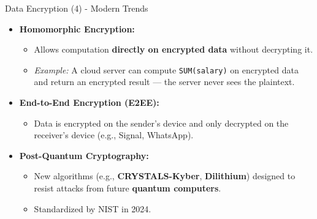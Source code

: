 \begin{frame}{Data Encryption (4) - Modern Trends}
    \Large
    
    \begin{itemize}
        
        \item \textbf{Homomorphic Encryption:}
        \begin{itemize}
            \large
            \item Allows computation \textbf{directly on encrypted data} without decrypting it.
            \item \textit{Example:} A cloud server can compute \texttt{SUM(salary)} on encrypted data and return an encrypted result --- the server never sees the plaintext.
        \end{itemize}
        
        \vspace{0.2cm}
        
        \item \textbf{End-to-End Encryption (E2EE):}
        \begin{itemize}
            \large
            \item Data is encrypted on the sender's device and only decrypted on the receiver's device (e.g., Signal, WhatsApp).
        \end{itemize}
        
        \vspace{0.2cm}
        
        \item \textbf{Post-Quantum Cryptography:}
        \begin{itemize}
            \large
            \item New algorithms (e.g., \textbf{CRYSTALS-Kyber}, \textbf{Dilithium}) designed to resist attacks from future \textbf{quantum computers}.
            \item Standardized by NIST in 2024.
        \end{itemize}
    \end{itemize}
\end{frame}


